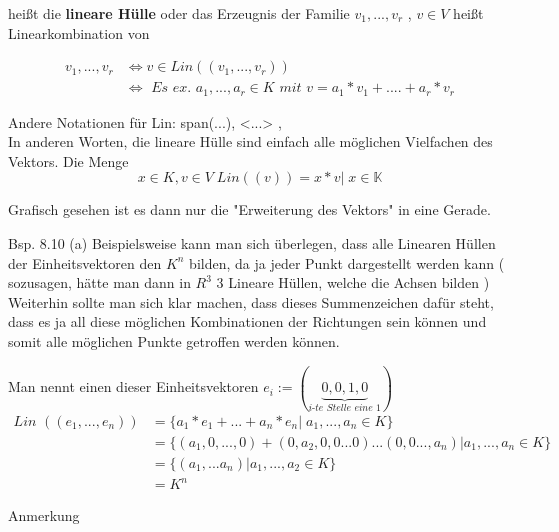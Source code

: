 \documentclass[smallheadings,12pt,a4paper]{scrartcl}
\begin{document}
heißt die \textbf{lineare Hülle} oder das Erzeugnis der Familie $v_1,...,v_r$ , $v \in V$ heißt Linearkombination von 



\begin{equation}
\begin{aligned}
v_1,...,v_r &\Leftrightarrow v \in \textit{Lin}((v_1,...,v_r)) \\
	& \Leftrightarrow \textit{  Es ex. } a_1,...,a_r \in K  \textit{ mit } v= a_1*v_1+....+a_r*v_r 
\end{aligned}
\end{equation}

Andere Notationen für Lin: span(...), <...> ,  \\

In anderen Worten, die lineare Hülle sind einfach alle möglichen Vielfachen des Vektors. Die Menge 
$$ x \in K , v \in V \; Lin((v))={x*v|\; x \in \mathbb{K}} $$

Grafisch gesehen ist es dann nur die "Erweiterung des Vektors" in eine Gerade. \\
\item[Bsp. 8.10]
(a) Beispielsweise kann man sich überlegen, dass alle Linearen Hüllen der Einheitsvektoren den $K^n$ bilden, da ja jeder Punkt dargestellt werden kann ( sozusagen, hätte man dann in $R^3$ 3 Lineare Hüllen, welche die Achsen bilden ) \\
Weiterhin sollte man sich klar machen, dass dieses Summenzeichen dafür steht, dass es ja all diese möglichen Kombinationen der Richtungen sein können und somit alle möglichen Punkte getroffen werden können.

Man nennt einen dieser Einheitsvektoren $e_i:=(\underbrace{0,0,1,0}_{\textit{i-te Stelle eine 1}})$ \\


\begin{equation}
\begin{aligned}
\textit{Lin }((e_1,...,e_n)) &= \{a_1*e_1+...+a_n*e_n | \; a_1,...,a_n \in K \} \\
		&=\{(a_1,0,...,0)+(0,a_2,0,0...0)... (0,0...,a_n) | a_1,...,a_n \in K \} \\
		&= \{ (a_1,...a_n) | a_1,...,a_2 \in K\} \\
		&= K^n 
\end{aligned}
\end{equation}



\newpage

\item[Anmerkung]
\end{document}
